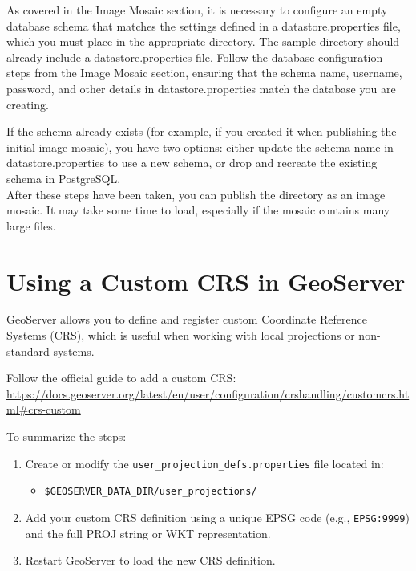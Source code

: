 \documentclass{article}
\begin{document}
As covered in the Image Mosaic section, it is necessary to configure an empty database schema that matches the settings defined in a datastore.properties file, which you must place in the appropriate directory. The sample directory should already include a datastore.properties file. Follow the database configuration steps from the Image Mosaic section, ensuring that the schema name, username, password, and other details in datastore.properties match the database you are creating.

If the schema already exists (for example, if you created it when publishing the initial image mosaic), you have two options: either update the schema name in datastore.properties to use a new schema, or drop and recreate the existing schema in PostgreSQL. \\

After these steps have been taken, you can publish the directory as an image mosaic. It may take some time to load, especially if the mosaic contains many large files.

\section{Using a Custom CRS in GeoServer}

GeoServer allows you to define and register custom Coordinate Reference Systems (CRS), which is useful when working with local projections or non-standard systems.

Follow the official guide to add a custom CRS:  
\url{https://docs.geoserver.org/latest/en/user/configuration/crshandling/customcrs.html#crs-custom}

To summarize the steps:

\begin{enumerate}
  \item Create or modify the \texttt{user\_projection\_defs.properties} file located in:
  \begin{itemize}
    \item \texttt{\$GEOSERVER\_DATA\_DIR/user\_projections/}
  \end{itemize}
  
  \item Add your custom CRS definition using a unique EPSG code (e.g., \texttt{EPSG:9999}) and the full PROJ string or WKT representation.

  \item Restart GeoServer to load the new CRS definition.
\end{enumerate}
\end{document}
